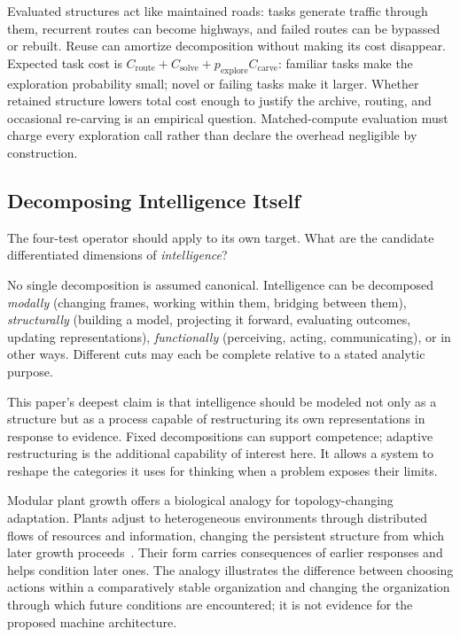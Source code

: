 \documentclass[11pt]{article}
\begin{document}
Evaluated structures act like maintained roads: tasks generate traffic through them, recurrent routes can become highways, and failed routes can be bypassed or rebuilt. Reuse can amortize decomposition without making its cost disappear. Expected task cost is $C_{\mathrm{route}} + C_{\mathrm{solve}} + p_{\mathrm{explore}}C_{\mathrm{carve}}$: familiar tasks make the exploration probability small; novel or failing tasks make it larger. Whether retained structure lowers total cost enough to justify the archive, routing, and occasional re-carving is an empirical question. Matched-compute evaluation must charge every exploration call rather than declare the overhead negligible by construction.

\subsection{Decomposing Intelligence Itself}
\label{sec:decompose-intelligence}

The four-test operator should apply to its own target. What are the candidate differentiated dimensions of \emph{intelligence}?

No single decomposition is assumed canonical. Intelligence can be decomposed \emph{modally} (changing frames, working within them, bridging between them), \emph{structurally} (building a model, projecting it forward, evaluating outcomes, updating representations), \emph{functionally} (perceiving, acting, communicating), or in other ways. Different cuts may each be complete relative to a stated analytic purpose.

This paper's deepest claim is that intelligence should be modeled not only as a structure but as a process capable of restructuring its own representations in response to evidence. Fixed decompositions can support competence; adaptive restructuring is the additional capability of interest here. It allows a system to reshape the categories it uses for thinking when a problem exposes their limits.

Modular plant growth offers a biological analogy for topology-changing adaptation. Plants adjust to heterogeneous environments through distributed flows of resources and information, changing the persistent structure from which later growth proceeds~\cite{oborny2019plant}. Their form carries consequences of earlier responses and helps condition later ones. The analogy illustrates the difference between choosing actions within a comparatively stable organization and changing the organization through which future conditions are encountered; it is not evidence for the proposed machine architecture.
\end{document}
